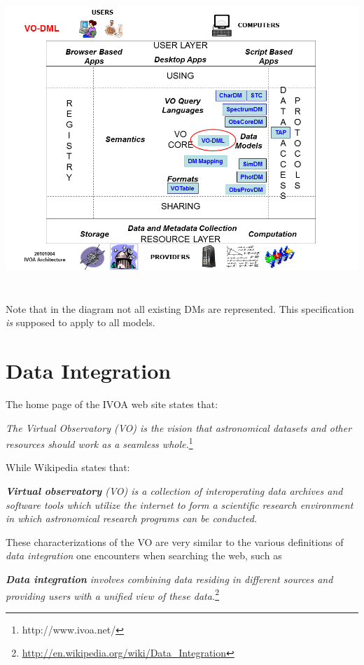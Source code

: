 \documentclass[10pt,a4paper]{ivoa}
\begin{document}
\includegraphics[width=6in,height=4.5in]{./media/image3.png}

Note that in the diagram not all existing DMs are represented. This
specification \emph{is} supposed to apply to all models.

\hypertarget{data-integration}{%
\section{\texorpdfstring{Data Integration
}{Data Integration }}\label{data-integration}}

The home page of the IVOA web site states that:

\emph{The Virtual Observatory (VO) is the vision that astronomical
datasets and other resources should work as a seamless
whole.}\footnote{http://www.ivoa.net/}

While Wikipedia states that:

\emph{\textbf{Virtual observatory} (VO) is a collection of
interoperating data archives and software tools which utilize the
internet to form a scientific research environment in which astronomical
research programs can be conducted.}

These characterizations of the VO are very similar to the various
definitions of \emph{data integration} one encounters when searching the
web, such as

\emph{\textbf{Data integration} involves combining data residing in
different sources and providing users with a unified view of these
data.}\footnote{\url{http://en.wikipedia.org/wiki/Data_Integration}}
\end{document}
